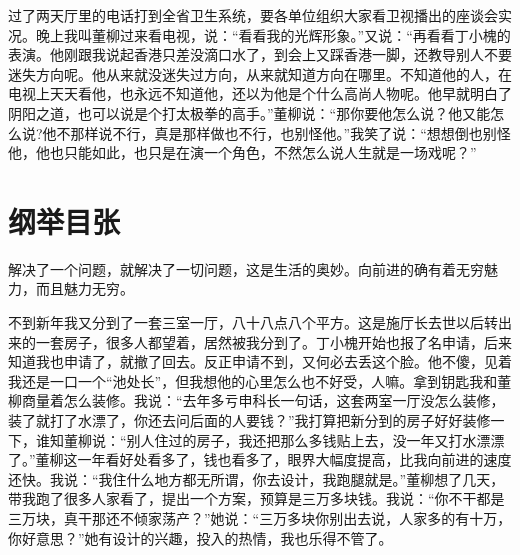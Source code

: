 \documentclass[12pt,oneside]{book}
\begin{document}
过了两天厅里的电话打到全省卫生系统，要各单位组织大家看卫视播出的座谈会实况。晚上我叫董柳过来看电视，说：``看看我的光辉形象。''又说：``再看看丁小槐的表演。他刚跟我说起香港只差没滴口水了，到会上又踩香港一脚，还教导别人不要迷失方向呢。他从来就没迷失过方向，从来就知道方向在哪里。不知道他的人，在电视上天天看他，也永远不知道他，还以为他是个什么高尚人物呢。他早就明白了阴阳之道，也可以说是个打太极拳的高手。''董柳说：``那你要他怎么说？他又能怎么说?他不那样说不行，真是那样做也不行，也别怪他。''我笑了说：``想想倒也别怪他，他也只能如此，也只是在演一个角色，不然怎么说人生就是一场戏呢？''


\chapter{纲举目张}

解决了一个问题，就解决了一切问题，这是生活的奥妙。向前进的确有着无穷魅力，而且魅力无穷。

不到新年我又分到了一套三室一厅，八十八点八个平方。这是施厅长去世以后转出来的一套房子，很多人都望着，居然被我分到了。丁小槐开始也报了名申请，后来知道我也申请了，就撤了回去。反正申请不到，又何必去丢这个脸。他不傻，见着我还是一口一个``池处长''，但我想他的心里怎么也不好受，人嘛。拿到钥匙我和董柳商量着怎么装修。我说：``去年多亏申科长一句话，这套两室一厅没怎么装修，装了就打了水漂了，你还去问后面的人要钱？''我打算把新分到的房子好好装修一下，谁知董柳说：``别人住过的房子，我还把那么多钱贴上去，没一年又打水漂漂了。''董柳这一年看好处看多了，钱也看多了，眼界大幅度提高，比我向前进的速度还快。我说：``我住什么地方都无所谓，你去设计，我跑腿就是。''董柳想了几天，带我跑了很多人家看了，提出一个方案，预算是三万多块钱。我说：``你不干都是三万块，真干那还不倾家荡产？''她说：``三万多块你别出去说，人家多的有十万，你好意思？''她有设计的兴趣，投入的热情，我也乐得不管了。
\end{document}
